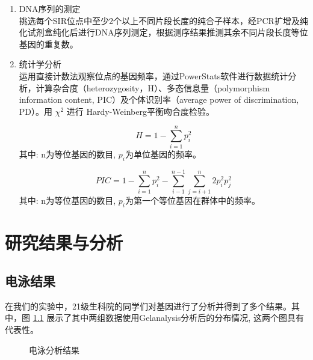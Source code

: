 \documentclass[AutoFakeBold]{LZUThesis}
\begin{document}
\begin{enumerate}
    \item DNA序列的测定 \\
    挑选每个SIR位点中至少2个以上不同片段长度的纯合子样本，经PCR扩增及纯化试剂盒纯化后进行DNA序列测定，根据测序结果推测其余不同片段长度等位基因的重复数。
    
    \item 统计学分析 \\
    运用直接计数法观察位点的基因频率，通过PowerStats软件进行数据统计分析，计算杂合度（heterozygosity，H）、多态信息量（polymorphism information content, PIC）及个体识别率（average power of discrimination, PD）。用 $\chi^2$ 进行 Hardy-Weinberg平衡吻合度检验。

    $$
    H = 1 - \sum_{i=1}^{n}p_i^2
    $$
    其中: n为等位基因的数目, $p_i$为单位基因的频率。\par
    $$
    PIC = 1 - \sum_{i=1}^{n}p_i^2 - \sum_{i-1}^{n-1}\sum_{j=i+1}^{n}2p_i^2p_j^2
    $$
    其中: n为等位基因的数目, $p_i$为第一个等位基因在群体中的频率。\par

\end{enumerate}


\chapter{研究结果与分析}

\section{电泳结果}
在我们的实验中，21级生科院的同学们对基因进行了分析并得到了多个结果。其中，图 \ref{fig:anamainegimg} 展示了其中两组数据使用Gelanalysis分析后的分布情况, 这两个图具有代表性。

\begin{figure}[H]
    \centering

    \hfill
    \caption{电泳分析结果}
    \label{fig:anamainegimg}
\end{figure}
\end{document}
